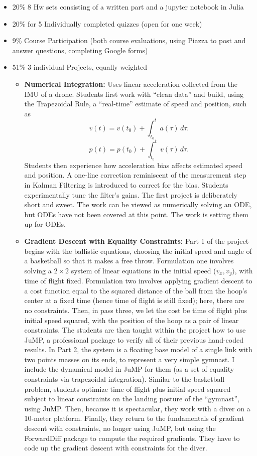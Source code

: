 \documentclass[letterpaper]{book}
\begin{document}
\begin{itemize}
    \item 20\% 8 Hw sets consisting of a written part and a jupyter notebook in Julia
    \item 20\% for 5 Individually completed quizzes (open for one week)
    \item 9\% Course Participation (both course evaluations, using Piazza to post and answer questions, completing Google forms)
    \item 51\% 3 individual Projects, equally weighted
    \begin{itemize}
        \item \textbf{Numerical Integration:} Uses linear acceleration collected from the IMU of a drone. Students first work with ``clean data'' and build, using the Trapezoidal Rule, a ``real-time'' estimate of speed and position, such as
        $$ v(t) = v(t_0) + \int_{t_0}^t a(\tau) \, d \tau.$$    
        $$ p(t) = p(t_0) + \int_{t_0}^t v(\tau) \, d \tau.$$   
        Students then experience how acceleration bias affects estimated speed and position. A one-line correction reminiscent of the measurement step in Kalman Filtering is introduced to correct for the bias. Students experimentally tune the filter's gains. The first project is deliberately short and sweet. The work can be viewed as numerically solving an ODE, but ODEs have not been covered at this point. The work is setting them up for ODEs. 
        \item \textbf{Gradient Descent with Equality Constraints:} Part 1 of the project begins with the ballistic equations, choosing the initial speed and angle of a basketball so that it makes a free throw. Formulation one involves solving a $2 \times 2$ system of linear equations in the initial speed ($v_x, v_y)$, with time of flight fixed. Formulation two involves applying gradient descent to a cost function equal to the squared distance of the ball from the hoop's center at a fixed time (hence time of flight is still fixed); here, there are no constraints. Then, in pass three, we let the cost be time of flight plus initial speed squared, with the position of the hoop as a pair of linear constraints. The students are then taught within the project how to use JuMP, a professional package to verify all of their previous hand-coded results. In Part 2, the system is a floating base model of a single link with two points masses on its ends, to represent a very simple gymnast. I include the dynamical model in JuMP for them (as a set of equality constraints via trapezoidal integration). Similar to the basketball problem, students optimize time of flight plus initial speed squared subject to linear constraints on the landing posture of the ``gymnast'', using JuMP. Then, because it is spectacular, they work with a diver on a 10-meter platform. Finally, they return to the fundamentals of gradient descent with constraints, no longer using JuMP, but using the ForwardDiff package to compute the required gradients. They have to code up the gradient descent with constraints for the diver. 

\end{itemize}
\end{itemize}
\end{document}
